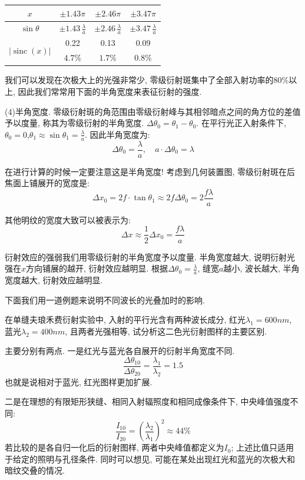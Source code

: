 \begin{table}[h!]
\centering
\renewcommand{\arraystretch}{1.8} %
\setlength{\tabcolsep}{18pt}      %

\begin{tabular}{|c|c|c|c|}
\hline
$x$
& $\pm 1.43\pi$
& $\pm 2.46\pi$
& $\pm 3.47\pi$ \\
\hline
$\sin\theta$
& $\pm 1.43\,\frac{\lambda}{a}$
& $\pm 2.46\,\frac{\lambda}{a}$
& $\pm 3.47\,\frac{\lambda}{a}$ \\
\hline
\multirow{2}{*}{$|\operatorname{sinc}(x)|$}
& 0.22 & 0.13 & 0.09 \\
\cline{2-4}
& $4.7\%$ & $1.7\%$ & $0.8\%$ \\
\hline
\end{tabular}

\end{table}

我们可以发现在次极大上的光强非常少, 零级衍射斑集中了全部入射功率的$80\%$以上, 因此我们常常用下面的半角宽度来表征衍射的强度.

(4)半角宽度. 零级衍射斑的角范围由零级衍射峰与其相邻暗点之间的角方位的差值予以度量, 称其为零级衍射的半角宽度. $\Delta \theta_0 = \theta_1-\theta_0$. 在平行光正入射条件下, $\theta_0=0$,$\theta_1\approx \sin \theta_1 =\frac{\lambda}{a}$. 因此半角宽度为:
\[
\Delta \theta_0 = \frac{\lambda}{a} , \quad a \cdot \Delta \theta_0 = \lambda
\]

在进行计算的时候一定要注意这是半角宽度!
考虑到几何装置图, 零级衍射斑在后焦面上铺展开的宽度是:
\[
\Delta x_0 = 2f\cdot \tan\theta_1 \approx 2f\Delta \theta_0 = 2\frac{f\lambda}{a}
\]

其他明纹的宽度大致可以被表示为:
\[
\Delta x \approx \frac{1}{2}\Delta x_0 = \frac{f\lambda}{a}
\]

衍射效应的强弱我们用零级衍射的半角宽度予以度量. 半角宽度越大, 说明衍射光强在$x$方向铺展的越开, 衍射效应越明显. 根据$\Delta \theta_0 = \frac{\lambda}{a}$, 缝宽$a$越小, 波长越大, 半角宽度越大, 衍射效应越明显.

下面我们用一道例题来说明不同波长的光叠加时的影响.

在单缝夫琅禾费衍射实验中, 入射的平行光含有两种波长成分, 红光$\lambda_1=600nm$, 蓝光$\lambda_2=400nm$, 且两者光强相等, 试分析这二色光衍射图样的主要区别.

主要分别有两点. 一是红光与蓝光各自展开的衍射半角宽度不同.
\[
\frac{\Delta \theta_{10}}{\Delta \theta_{20}}=\frac{\lambda_1}{\lambda_2} =1.5
\]
也就是说相对于蓝光, 红光图样更加扩展.

二是在理想的有限矩形狭缝、相同入射辐照度和相同成像条件下, 中央峰值强度不同:
\[
\frac{I_{10}}{I_{20}}=\left(\frac{\lambda_2}{\lambda_1}\right)^2\approx 44\%
\]
若比较的是各自归一化后的衍射图样, 两者中央峰值都定义为$I_0$; 上述比值只适用于给定的照明与孔径条件. 同时可以想见, 可能在某处出现红光和蓝光的次极大和暗纹交叠的情况.

